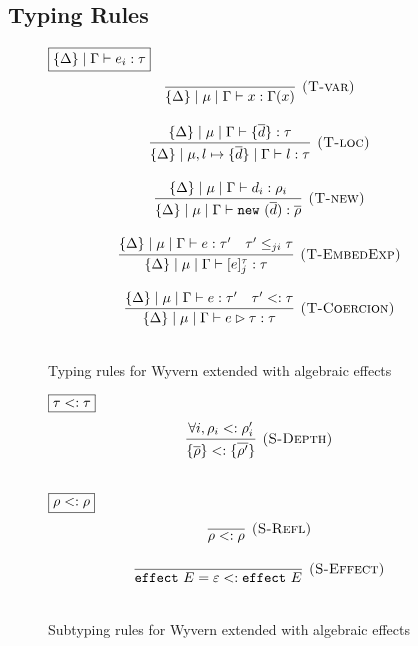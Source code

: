 \subsection{Typing Rules}
\begin{figure}[t]
\footnotesize{
\noindent$\fbox{$\{\Delta\} \mid \Gamma  \vdash e_i : \tau$}$
\[
\begin{array}{c}

\infer[\textsc{(T-var)}]
  {\{\Delta\}\mid \mu  \mid \Gamma \vdash x : \Gamma(x)}
  {} \\[3ex]
  
\infer[\textsc{(T-loc)}]
  {\{\Delta\}\mid \mu, l \mapsto \{\overline{d}\} \mid \Gamma \vdash l : \tau}
  {\{\Delta\}\mid \mu \mid \Gamma \vdash \{\overline{d}\} : \tau}\\[3ex]

\infer[\textsc{(T-new)}] 
	{\{\Delta\}\mid \mu \mid \Gamma \vdash  \keyw{new}(\overline{d}) : \overline{\rho}}
	{\{\Delta\}\mid \mu \mid \Gamma \vdash d_i : \rho_i}\\[3ex]

\infer[\textsc{(T-EmbedExp)}] 
	{\{\Delta\}\mid \mu \mid \Gamma \vdash [e]^\tau_j : \tau}
	{\{\Delta\}\mid \mu \mid \Gamma \vdash e : \tau' & \tau' \leq_{ji} \tau }\\[3ex]


\infer[\textsc{(T-Coercion)}] 
	{\{\Delta\}\mid \mu \mid \Gamma \vdash e \rhd \tau : \tau}
	{ \{\Delta\}\mid \mu \mid \Gamma \vdash e : \tau' & \tau' <: \tau}\\[3ex]
\end{array}
\]
\label{static-wyv}
\caption{Typing rules for Wyvern extended with algebraic effects}
}
\end{figure}

\begin{figure}[t]
\footnotesize{
\noindent$\fbox{$\tau <: \tau$}$
\[
\begin{array}{c}
  
\infer[\textsc{(S-Depth)}]
  {\{ \overline{\rho} \} <:  \{\overline{\rho'}\}}
  {\forall i, \rho_i <: \rho'_i} \\[3ex]
  
\end{array}
\]

\noindent$\fbox{$\rho <: \rho$}$
\[
\begin{array}{c}
  
\infer[\textsc{(S-Refl)}]
  {\rho <: \rho}
  {} \\[3ex]
  
\infer[\textsc{(S-Effect)}]
  {\keyw{effect} E = \varepsilon <: \keyw{effect} E}
  {} \\[3ex]
  
\end{array}
\]


\label{subtyping-wyv}
\caption{Subtyping rules for Wyvern extended with algebraic effects}
}
\end{figure}




